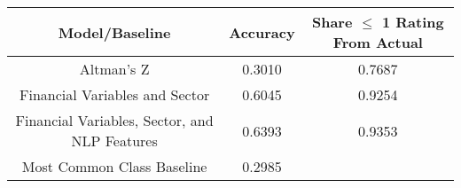 \tiny
\begin{tabular}{ccc}
\toprule
Model/Baseline & Accuracy & Share $\le$ 1 Rating From Actual \\
\midrule
Altman's Z & 0.3010 & 0.7687 \\
Financial Variables and Sector & 0.6045 & 0.9254 \\
Financial Variables, Sector, and NLP Features & 0.6393 & 0.9353 \\
Most Common Class Baseline & 0.2985 &  \\
\bottomrule
\end{tabular}

\normalsize